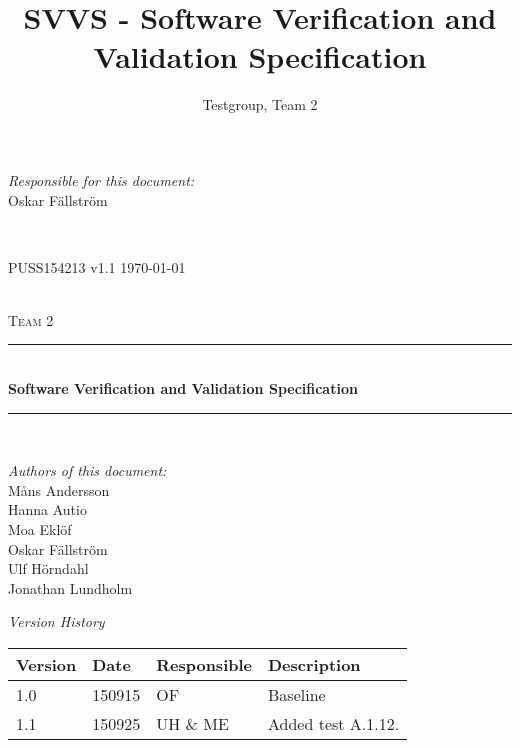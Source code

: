 \documentclass[a4paper]{article}
\title{SVVS - Software Verification and Validation Specification}
\author{Testgroup, Team 2}
\begin{document}
\begin{titlepage}
\newcommand{\HRule}{\rule{\linewidth}{0.5mm}}

\begin{minipage}{0.5\textwidth}
\begin{flushleft} %
\textit{Responsible for this document:}\\
Oskar Fällström %
\end{flushleft}
\end{minipage}
~
\begin{minipage}{0.4\textwidth}
\begin{flushright}
PUSS154213 v1.1 %
\today
\end{flushright}
\end{minipage}\\[3cm]

\centering
\textsc{\LARGE Team 2}\\[0.5cm]

\HRule \\[0.4cm]
{ \huge \bfseries Software Verification and Validation  Specification}\\[0.4cm] %
\HRule \\[1.5cm]

\vfill
\begin{flushleft}
\textit{Authors of this document:}\\
Måns Andersson \\
Hanna Autio \\
Moa Eklöf \\
Oskar Fällström \\
Ulf Hörndahl \\
Jonathan Lundholm
\end{flushleft}


\end{titlepage}

\begin{center}
\textit{\large Version History}

    \begin{tabular}{ | l | l | l | p{5cm} |}
    \hline
    \textbf{Version}	& \textbf{Date}		& \textbf{Responsible}		& \textbf{Description}					\\ \hline
    1.0					& 150915 			& OF						& Baseline								\\ \hline
    1.1					&	150925			&	UH \& ME				&	Added test A.1.12. \\ \hline
    \end{tabular}
\end{center}
\end{document}
